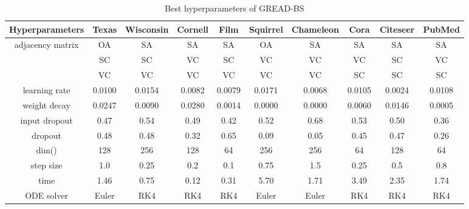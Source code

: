 \documentclass{article}
\theoremstyle{plain}
\theoremstyle{definition}
\theoremstyle{remark}
\begin{document}
\begin{table*}[ht!]
    \centering
    \small
    \caption{Best hyperparameters of GREAD-BS}
    \label{tab:best_BS}
    \begin{tabular}{c ccccccccc} \toprule
        Hyperparameters  & Texas  & Wisconsin 
                                           & Cornell& Film   & Squirrel 
                                                                      & Chameleon
                                                                               & Cora   & Citeseer 
                                                                                                 & PubMed\\ \midrule
        adjacency matrix & OA     & SA     & SA     & SA     & OA     & SA     & SA     & SA     & SA    \\
                 & SC     & SC     & VC     & SC     & VC     & VC     & VC     & SC     & VC    \\
                  & VC     & VC     & VC     & VC     & VC     & VC     & SC     & SC     & SC    \\
        learning rate    & 0.0100 & 0.0154 & 0.0082 & 0.0079 & 0.0171 & 0.0068 & 0.0105 & 0.0024 & 0.0108\\
        weight decay     & 0.0247 & 0.0090 & 0.0280 & 0.0014 & 0.0000 & 0.0000 & 0.0060 & 0.0146 & 0.0005\\
        input dropout    & 0.47   & 0.54   & 0.49   & 0.42   & 0.52   & 0.68   & 0.53   & 0.50   & 0.36  \\
        dropout          & 0.48   & 0.48   & 0.32   & 0.65   & 0.09   & 0.05   & 0.45   & 0.47   & 0.26  \\
        dim()& 128    & 256    & 128    & 64     & 256    & 256    & 64     & 128    & 64    \\
        step size  & 1.0    & 0.25   & 0.2    & 0.1    & 0.75   & 1.5    & 0.25   & 0.5    & 0.8   \\
        time          & 1.46   & 0.75   & 0.12   & 0.31   & 5.70   & 1.71   & 3.49   & 2.35   & 1.74  \\
        ODE solver       & Euler  & RK4    & RK4    & RK4    & Euler  & Euler  & RK4    & RK4    & RK4  \\
        \bottomrule
    \end{tabular}
\end{table*}
\end{document}
